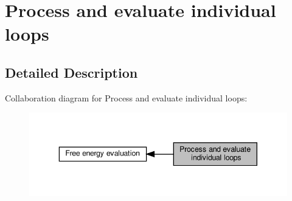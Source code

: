 \hypertarget{group__loops}{}\section{Process and evaluate individual loops}
\label{group__loops}


\subsection{Detailed Description}
Collaboration diagram for Process and evaluate individual loops\+:
\nopagebreak
\begin{figure}[H]
\begin{center}
\leavevmode
\includegraphics[width=343pt]{group__loops}
\end{center}
\end{figure}
